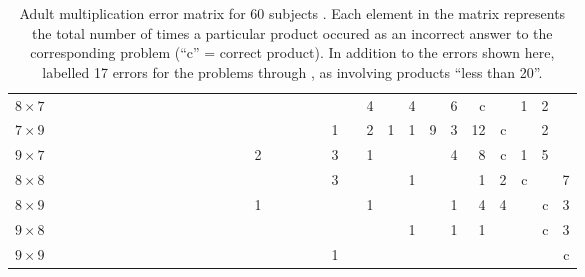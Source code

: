 \begin{table}
{{\begin{tabular}{lrrrrrrrrrrrrrrrrrrrrrrrrrrrrrrr}
$8\times7$&&&&&&&&&&&&&&&&&&&&&&4&&4&&6&c&&1&2&\\
$7\times9$&&&&&&&&&&&&&&&&&&&&1&&2&1&1&9&3&12&c&&2&\\
$9\times7$&&&&&&&&&&&&&&&2&&&&&3&&1&&&&4&8&c&1&5&\\
$8\times8$&&&&&&&&&&&&&&&&&&&&3&&&&1&&&1&2&c&&7\\
$8\times9$&&&&&&&&&&&&&&&1&&&&&&&1&&&&1&4&4&&c&3\\
$9\times8$&&&&&&&&&&&&&&&&&&&&&&&&1&&1&1&&&c&3\\
$9\times9$&&&&&&&&&&&&&&&&&&&&1&&&&&&&&&&&c\\
\end{tabular}
\caption{Adult multiplication error matrix for 60 subjects
\protect\cite[appendix~A]{campment}.  Each element in the matrix represents
the total number of times a particular product occured as an incorrect
answer to the corresponding problem (``c'' = correct product). In addition
to the errors shown here, \protect{} labelled 17 errors for
the problems  through , as involving products ``less than 20''.}}}
\label{adulterr}
\end{table}
